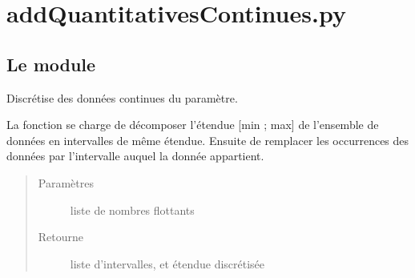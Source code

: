 \documentclass[letterpaper,10pt,french]{sphinxmanual}
\begin{document}
\chapter{addQuantitativesContinues.py}
\label{\detokenize{addQuantitativesContinues:module-add.addQuantitativesContinues}}\label{\detokenize{addQuantitativesContinues:addquantitativescontinues-py}}\label{\detokenize{addQuantitativesContinues::doc}}

\section{Le module }
\label{\detokenize{addQuantitativesContinues:le-module-analyse-de-donnees-quantitatives-continues}}

\begin{fulllineitems}
\label{\detokenize{addQuantitativesContinues:add.addQuantitativesContinues.discretisation}}
Discrétise des données continues du paramètre.

La fonction se charge de décomposer l’étendue {[}min ; max{]} de l’ensemble de données en  intervalles de même étendue.
Ensuite de remplacer les occurrences des données par l’intervalle auquel la donnée appartient.
\begin{quote}\begin{description}
\item[{Paramètres}] \leavevmode
{} \textendash{} liste de nombres flottants

\item[{Retourne}] \leavevmode
liste d’intervalles, et étendue discrétisée

\end{description}\end{quote}

\end{fulllineitems}

\end{document}
